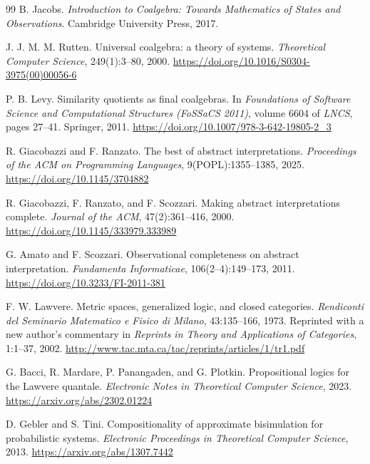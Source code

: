 \begin{thebibliography}{99}
B. Jacobs.
\newblock \emph{Introduction to Coalgebra: Towards Mathematics of States and
Observations}.
\newblock Cambridge University Press, 2017.

J. J. M. M. Rutten.
\newblock Universal coalgebra: a theory of systems.
\newblock \emph{Theoretical Computer Science}, 249(1):3--80, 2000.
\newblock \url{https://doi.org/10.1016/S0304-3975(00)00056-6}

P. B. Levy.
\newblock Similarity quotients as final coalgebras.
\newblock In \emph{Foundations of Software Science and Computational Structures
(FoSSaCS 2011)}, volume 6604 of \emph{LNCS}, pages 27--41. Springer, 2011.
\newblock \url{https://doi.org/10.1007/978-3-642-19805-2_3}

R. Giacobazzi and F. Ranzato.
\newblock The best of abstract interpretations.
\newblock \emph{Proceedings of the ACM on Programming Languages},
9(POPL):1355--1385, 2025.
\newblock \url{https://doi.org/10.1145/3704882}

R. Giacobazzi, F. Ranzato, and F. Scozzari.
\newblock Making abstract interpretations complete.
\newblock \emph{Journal of the ACM}, 47(2):361--416, 2000.
\newblock \url{https://doi.org/10.1145/333979.333989}

G. Amato and F. Scozzari.
\newblock Observational completeness on abstract interpretation.
\newblock \emph{Fundamenta Informaticae}, 106(2--4):149--173, 2011.
\newblock \url{https://doi.org/10.3233/FI-2011-381}

F. W. Lawvere.
\newblock Metric spaces, generalized logic, and closed categories.
\newblock \emph{Rendiconti del Seminario Matematico e Fisico di Milano},
43:135--166, 1973.
\newblock Reprinted with a new author's commentary in \emph{Reprints in Theory
and Applications of Categories}, 1:1--37, 2002.
\newblock \url{http://www.tac.mta.ca/tac/reprints/articles/1/tr1.pdf}

G. Bacci, R. Mardare, P. Panangaden, and G. Plotkin.
\newblock Propositional logics for the Lawvere quantale.
\newblock \emph{Electronic Notes in Theoretical Computer Science}, 2023.
\newblock \url{https://arxiv.org/abs/2302.01224}

D. Gebler and S. Tini.
\newblock Compositionality of approximate bisimulation for probabilistic
systems.
\newblock \emph{Electronic Proceedings in Theoretical Computer Science}, 2013.
\newblock \url{https://arxiv.org/abs/1307.7442}


\end{thebibliography}
